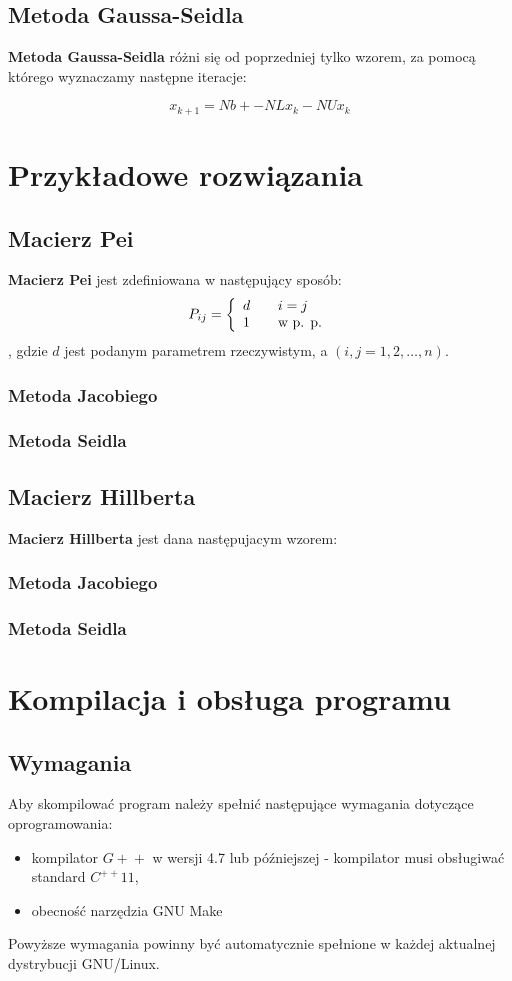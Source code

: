 \documentclass[a4paper,11pt]{article}
\begin{document}
\subsection{Metoda Gaussa-Seidla}
  \textbf{Metoda Gaussa-Seidla} różni się od poprzedniej tylko wzorem, za 
  pomocą którego wyznaczamy następne iteracje:
  
  $$ x_{k+1} = Nb + -NLx_k - NUx_k $$

\section{Przykładowe rozwiązania}
\subsection{Macierz Pei}
  \textbf{Macierz Pei} jest zdefiniowana w następujący sposób:
    $$
        P_{ij} = \left\{\begin{array}{l l}
            d & \quad i = j \\
            1 & \quad \textrm{w p. p.}
        \end{array}\right.
    $$
    , gdzie $d$ jest podanym parametrem rzeczywistym, a $ (i, j = 1, 2, \dots, n) $. 
\subsubsection{Metoda Jacobiego}
\subsubsection{Metoda Seidla}

\subsection{Macierz Hillberta}
  \textbf{Macierz Hillberta} jest dana następujacym wzorem:
\subsubsection{Metoda Jacobiego}
\subsubsection{Metoda Seidla}

\section{Kompilacja i obsługa programu}
    \subsection{Wymagania}
    Aby skompilować program należy spełnić następujące wymagania dotyczące oprogramowania:
    \begin{itemize}
      \item kompilator $ G\!+\!+ $ w wersji 4.7 lub późniejszej - kompilator musi obsługiwać standard $ C^{++}11 $,
      \item obecność narzędzia GNU Make
    \end{itemize}
    Powyższe wymagania powinny być automatycznie spełnione w każdej aktualnej dystrybucji GNU/Linux.
    
\end{document}
